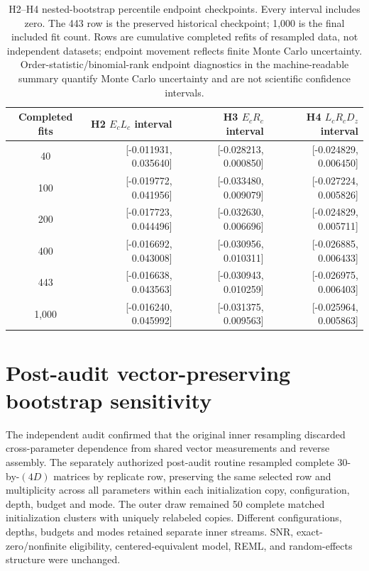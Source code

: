 \documentclass[pdflatex,sn-basic,Numbered]{sn-jnl}
\begin{document}
\begin{table}[t]\centering\small
\begin{tabular}{crrr}
\toprule
Completed fits & H2 $E_cL_c$ interval & H3 $E_cR_c$ interval & H4 $L_cR_cD_z$ interval \\
\midrule
40    & [-0.011931, 0.035640] & [-0.028213, 0.000850] & [-0.024829, 0.006450] \\
100   & [-0.019772, 0.041956] & [-0.033480, 0.009079] & [-0.027224, 0.005826] \\
200   & [-0.017723, 0.044496] & [-0.032630, 0.006696] & [-0.024829, 0.005711] \\
400   & [-0.016692, 0.043008] & [-0.030956, 0.010311] & [-0.026885, 0.006433] \\
443   & [-0.016638, 0.043563] & [-0.030943, 0.010259] & [-0.026975, 0.006403] \\
1,000 & [-0.016240, 0.045992] & [-0.031375, 0.009563] & [-0.025964, 0.005863] \\
\bottomrule
\end{tabular}
\caption{H2--H4 nested-bootstrap percentile endpoint checkpoints. Every interval includes zero. The 443 row is the preserved historical checkpoint; 1,000 is the final included fit count. Rows are cumulative completed refits of resampled data, not independent datasets; endpoint movement reflects finite Monte Carlo uncertainty. Order-statistic/binomial-rank endpoint diagnostics in the machine-readable summary quantify Monte Carlo uncertainty and are not scientific confidence intervals.}
\label{supp:tab:bootstrap-checkpoints}
\end{table}

\section{Post-audit vector-preserving bootstrap sensitivity}\label{supp:sec:vector-bootstrap}
The independent audit confirmed that the original inner resampling discarded cross-parameter dependence from shared vector measurements and reverse assembly. The separately authorized post-audit routine resampled complete 30-by-$(4D)$ matrices by replicate row, preserving the same selected row and multiplicity across all parameters within each initialization copy, configuration, depth, budget and mode. The outer draw remained 50 complete matched initialization clusters with uniquely relabeled copies. Different configurations, depths, budgets and modes retained separate inner streams. SNR, exact-zero/nonfinite eligibility, centered-equivalent model, REML, and random-effects structure were unchanged.
\end{document}
